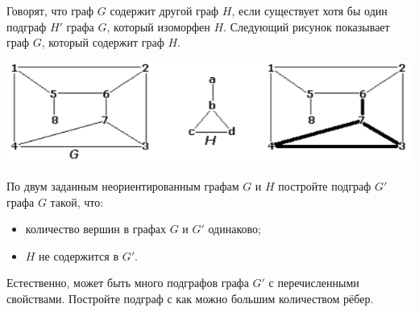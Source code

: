 Говорят, что граф $G$ содержит другой граф $H$, если существует
хотя бы один подграф $H'$ графа $G$, который изоморфен $H$.
Следующий рисунок показывает граф $G$, который содержит граф $H$.

\begin{center}
\includegraphics[scale=0.7]{pic3.png}
\end{center}

По двум заданным неориентированным графам $G$ и $H$ постройте подграф $G'$
графа $G$ такой, что:
\begin{itemize}
\item количество вершин в графах $G$ и $G'$ одинаково;
\item $H$ не содержится в $G'$.
\end{itemize}
Естественно, может быть много подграфов графа $G'$
с перечисленными свойствами.
Постройте подграф с как можно большим количеством рёбер.
